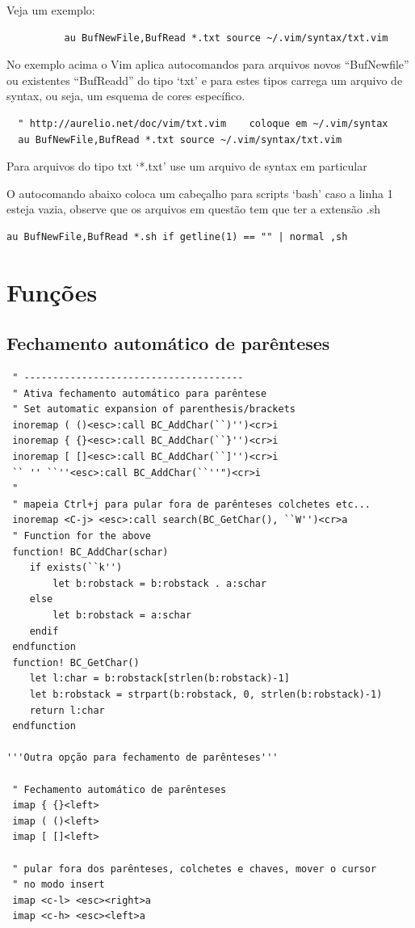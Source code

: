 \documentclass[10pt,a4paper,openany]{book}
\begin{document}
Veja um exemplo:

\begin{verbatim}
		  au BufNewFile,BufRead *.txt source ~/.vim/syntax/txt.vim
\end{verbatim}

No exemplo acima o Vim aplica autocomandos para arquivos novos
``BufNewfile'' ou existentes ``BufReadd'' do tipo `txt' e para estes tipos
carrega um arquivo de syntax, ou seja, um esquema de cores específico.

\begin{verbatim}
  " http://aurelio.net/doc/vim/txt.vim    coloque em ~/.vim/syntax
  au BufNewFile,BufRead *.txt source ~/.vim/syntax/txt.vim
\end{verbatim}

Para arquivos do tipo txt `*.txt' use um arquivo de syntax em particular

O autocomando abaixo coloca um cabeçalho para scripts `bash' caso a
linha 1 esteja vazia, observe que os arquivos em questão tem que ter a
extensão .sh

\begin{verbatim}
au BufNewFile,BufRead *.sh if getline(1) == "" | normal ,sh
\end{verbatim}


\section{Funções}
\label{sec:Funções}

\subsection{Fechamento automático de parênteses}
\label{sec:Fechamento automático de parênteses}

\begin{verbatim}
 " --------------------------------------
 " Ativa fechamento automático para parêntese
 " Set automatic expansion of parenthesis/brackets
 inoremap ( ()<esc>:call BC_AddChar(``)'')<cr>i
 inoremap { {}<esc>:call BC_AddChar(``}'')<cr>i
 inoremap [ []<esc>:call BC_AddChar(``]'')<cr>i
 `` '' ``''<esc>:call BC_AddChar(``''")<cr>i
 "
 " mapeia Ctrl+j para pular fora de parênteses colchetes etc...
 inoremap <C-j> <esc>:call search(BC_GetChar(), ``W'')<cr>a
 " Function for the above
 function! BC_AddChar(schar)
    if exists(``k'')
        let b:robstack = b:robstack . a:schar
    else
        let b:robstack = a:schar
    endif
 endfunction
 function! BC_GetChar()
    let l:char = b:robstack[strlen(b:robstack)-1]
    let b:robstack = strpart(b:robstack, 0, strlen(b:robstack)-1)
    return l:char
 endfunction

'''Outra opção para fechamento de parênteses'''

 " Fechamento automático de parênteses
 imap { {}<left>
 imap ( ()<left>
 imap [ []<left>

 " pular fora dos parênteses, colchetes e chaves, mover o cursor
 " no modo insert
 imap <c-l> <esc><right>a
 imap <c-h> <esc><left>a
\end{verbatim}
\end{document}
